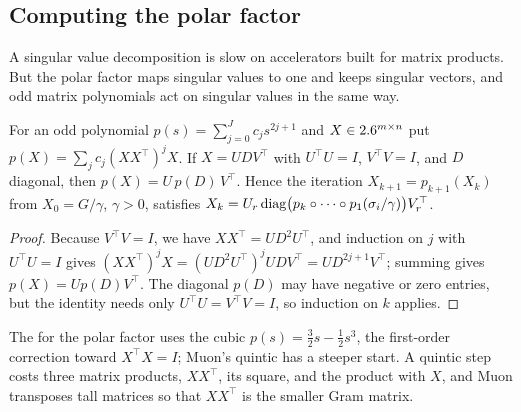 \begin{refsection}
\subsection{Computing the polar factor}

A singular value decomposition is slow on accelerators built for matrix products. But the polar factor maps singular values to one and keeps singular vectors, and odd matrix polynomials act on singular values in the same way.

\begin{lemma}\label{lem:spectral:oddpoly}
For an odd polynomial $p(s)=\sum_{j=0}^Jc_js^{2j+1}$ and $X\in2.6^{m\times n}$ put $p(X)=\sum_jc_j(XX^\top)^jX$. If $X=UDV^\top$ with $U^\top U=I$, $V^\top V=I$, and $D$ diagonal, then $p(X)=U\,p(D)\,V^\top$. Hence the iteration $X_{k+1}=p_{k+1}(X_k)$ from $X_0=G/\gamma$, $\gamma>0$, satisfies $X_k=U_r\operatorname{diag}\bigl(p_k\circ\dots\circ p_1(\sigma_i/\gamma)\bigr)V_r^\top$.
\end{lemma}

\begin{proof}
Because $V^\top V=I$, we have $XX^\top=UD^2U^\top$, and induction on $j$ with $U^\top U=I$ gives $(XX^\top)^jX=(UD^2U^\top)^jUDV^\top=UD^{2j+1}V^\top$; summing gives $p(X)=Up(D)V^\top$. The diagonal $p(D)$ may have negative or zero entries, but the identity needs only $U^\top U=V^\top V=I$, so induction on $k$ applies.
\end{proof}

The  for the polar factor uses the cubic $p(s)=\frac32s-\frac12s^3$, the first-order correction toward $X^\top X=I$; Muon's quintic has a steeper start. A quintic step costs three matrix products, $XX^\top$, its square, and the product with $X$, and Muon transposes tall matrices so that $XX^\top$ is the smaller Gram matrix.


\end{refsection}
